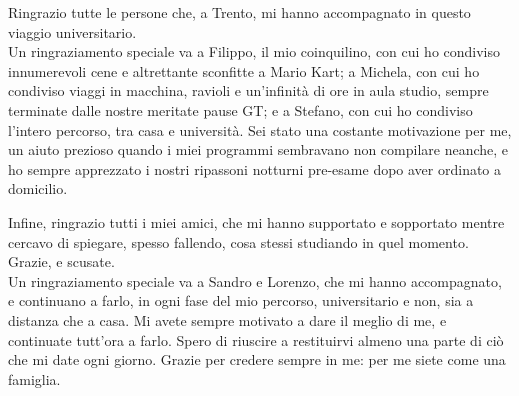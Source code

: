 \begin{flushleft}
Ringrazio tutte le persone che, a Trento, mi hanno accompagnato in questo viaggio universitario. \\
Un ringraziamento speciale va a Filippo, il mio coinquilino, con cui ho condiviso innumerevoli cene e altrettante sconfitte a Mario Kart; a Michela, con cui ho condiviso viaggi in macchina, ravioli e un’infinità di ore in aula studio, sempre terminate dalle nostre meritate pause GT; e a Stefano, con cui ho condiviso l’intero percorso, tra casa e università. Sei stato una costante motivazione per me, un aiuto prezioso quando i miei programmi sembravano non compilare neanche, e ho sempre apprezzato i nostri ripassoni notturni pre-esame dopo aver ordinato a domicilio.
\par\vspace{2em}

Infine, ringrazio tutti i miei amici, che mi hanno supportato e sopportato mentre cercavo di spiegare, spesso fallendo, cosa stessi studiando in quel momento. Grazie, e scusate. \\ 
Un ringraziamento speciale va a Sandro e Lorenzo, che mi hanno accompagnato, e continuano a farlo, in ogni fase del mio percorso, universitario e non, sia a distanza che a casa.
Mi avete sempre motivato a dare il meglio di me, e continuate tutt’ora a farlo. Spero di riuscire a restituirvi almeno una parte di ciò che mi date ogni giorno.
Grazie per credere sempre in me: per me siete come una famiglia.
\par\vspace{2em}

\end{flushleft}

\cleardoublepage

